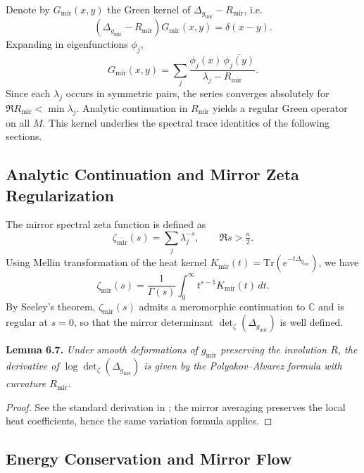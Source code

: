 Denote by \(G_{\mathrm{mir}}(x,y)\)
the Green kernel of \(\Delta_{g_{\mathrm{mir}}}-R_{\mathrm{mir}}\),
i.e.
\[
(\Delta_{g_{\mathrm{mir}}}-R_{\mathrm{mir}})G_{\mathrm{mir}}(x,y)
=\delta(x-y).
\]
Expanding in eigenfunctions \(\phi_j\),
\[
G_{\mathrm{mir}}(x,y)
=\sum_{j}\frac{\phi_{j}(x)\,\overline{\phi_{j}(y)}}{\lambda_{j}-R_{\mathrm{mir}}}.
\]
Since each \(\lambda_{j}\) occurs in symmetric pairs,
the series converges absolutely for \(\Re R_{\mathrm{mir}}<\min \lambda_{j}\).
Analytic continuation in \(R_{\mathrm{mir}}\)
yields a regular Green operator on all \(M\).
This kernel underlies the spectral trace identities
of the following sections. %

\subsection{Analytic Continuation and Mirror Zeta Regularization}\relax \hspace{0pt}

The mirror spectral zeta function is defined as
\begin{equation}
\zeta_{\mathrm{mir}}(s)
=\sum_{j}\lambda_{j}^{-s},
\qquad \Re s>\tfrac{n}{2}.
\end{equation}
Using Mellin transformation of the heat kernel
\(K_{\mathrm{mir}}(t)=\mathrm{Tr}(e^{-t\Delta_{g_{\mathrm{mir}}}})\),
we have
\begin{equation}
\zeta_{\mathrm{mir}}(s)
=\frac{1}{\Gamma(s)}
\int_{0}^{\infty}t^{s-1}K_{\mathrm{mir}}(t)\,dt.
\end{equation}
By Seeley’s theorem, \(\zeta_{\mathrm{mir}}(s)\)
admits a meromorphic continuation to \(\mathbb{C}\)
and is regular at \(s=0\),
so that the mirror determinant
\(\det_{\zeta}(\Delta_{g_{\mathrm{mir}}})\)
is well defined. %

\noindent
\textbf{Lemma 6.7.}
\emph{Under smooth deformations of \(g_{\mathrm{mir}}\)
preserving the involution \(R\),
the derivative of \(\log\det_{\zeta}(\Delta_{g_{\mathrm{mir}}})\)
is given by the Polyakov–Alvarez formula with curvature \(R_{\mathrm{mir}}\).}

\begin{proof}
See the standard derivation in \cite{Polyakov1981,Alvarez1983,BismutFreed1986};
the mirror averaging preserves the local heat coefficients,
hence the same variation formula applies.
\end{proof}

\subsection{Energy Conservation and Mirror Flow}\relax \hspace{0pt}

